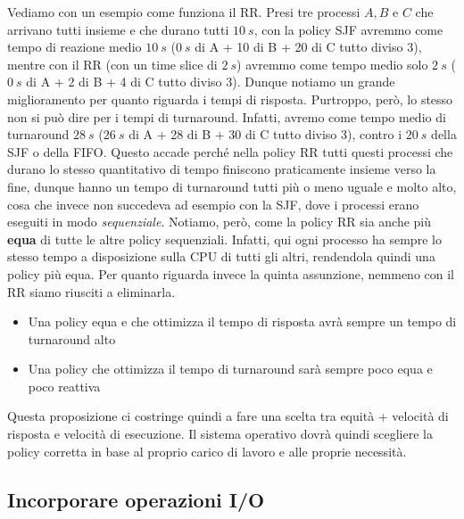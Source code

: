\documentclass[11pt, a4paper, titlepage, oneside]{scrbook}
\begin{document}
Vediamo con un esempio come funziona il RR. Presi tre processi $A, B$ e $C$ che arrivano tutti insieme e che durano tutti $\SI{10}{s}$, con la policy SJF avremmo come tempo di reazione medio $\SI{10}{s}$ ($\SI{0}{s}$ di A + 10 di B + 20 di C tutto diviso 3), mentre con il RR (con un time slice di $\SI{2}{s}$) avremmo come tempo medio solo \textbf{\boldmath$\SI[reset-math-version=false]{2}{s}$} ($\SI{0}{s}$ di A + 2 di B + 4 di C tutto diviso 3). Dunque notiamo un grande miglioramento per quanto riguarda i tempi di risposta. Purtroppo, però, lo stesso non si può dire per i tempi di turnaround. Infatti, avremo come tempo medio di turnaround \textbf{\boldmath$\SI[reset-math-version=false]{28}{s}$} ($\SI{26}{s}$ di A + 28 di B + 30 di C tutto diviso 3), contro i $\SI{20}{s}$ della SJF o della FIFO. Questo accade perché nella policy RR tutti questi processi che durano lo stesso quantitativo di tempo finiscono praticamente insieme verso la fine, dunque hanno un tempo di turnaround tutti più o meno uguale e molto alto, cosa che invece non succedeva ad esempio con la SJF, dove i processi erano eseguiti in modo \textit{sequenziale}. Notiamo, però, come la policy RR sia anche più \textbf{equa} di tutte le altre policy sequenziali. Infatti, qui ogni processo ha sempre lo stesso tempo a disposizione sulla CPU di tutti gli altri, rendendola quindi una policy più equa. Per quanto riguarda invece la quinta assunzione, nemmeno con il RR siamo riusciti a eliminarla.

\begin{Proposizione}[]
\label{propos-trade-off}
\begin{itemize}
    \item Una policy equa e che ottimizza il tempo di risposta avrà sempre un tempo di turnaround alto
    \item Una policy che ottimizza il tempo di turnaround sarà sempre poco equa e poco reattiva
\end{itemize}
\end{Proposizione}

Questa proposizione ci costringe quindi a fare una scelta tra equità + velocità di risposta e velocità di esecuzione. Il sistema operativo dovrà  quindi scegliere la policy corretta in base al proprio carico di lavoro e alle proprie necessità.

\subsection{Incorporare operazioni I/O}
\end{document}
